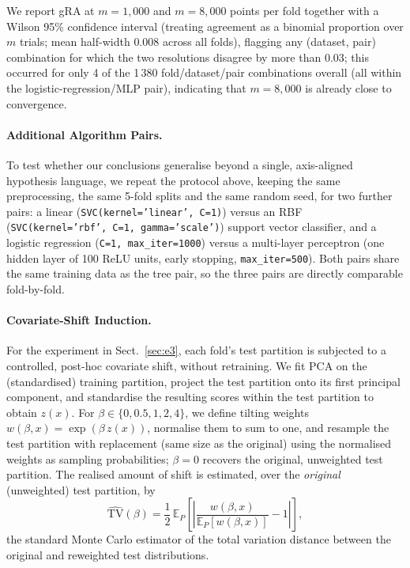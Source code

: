 \documentclass[runningheads]{llncs}
\begin{document}
We report gRA at $m = 1{,}000$ and $m = 8{,}000$ points per fold together with a Wilson 95\% confidence interval (treating agreement as a binomial proportion over $m$ trials; mean half-width $0.008$ across all folds), flagging any (dataset, pair) combination for which the two resolutions disagree by more than $0.03$; this occurred for only 4 of the 1\,380 fold/dataset/pair combinations overall (all within the logistic-regression/MLP pair), indicating that $m = 8{,}000$ is already close to convergence.

\paragraph{Additional Algorithm Pairs.}
\label{sec:extra-pairs}
To test whether our conclusions generalise beyond a single, axis-aligned hypothesis language, we repeat the protocol above, keeping the same preprocessing, the same 5-fold splits and the same random seed, for two further pairs: a linear (\texttt{SVC(kernel='linear', C=1)}) versus an RBF (\texttt{SVC(kernel='rbf', C=1, gamma='scale')}) support vector classifier, and a logistic regression (\texttt{C=1, max\_iter=1000}) versus a multi-layer perceptron (one hidden layer of 100 ReLU units, early stopping, \texttt{max\_iter=500}). Both pairs share the same training data as the tree pair, so the three pairs are directly comparable fold-by-fold.

\paragraph{Covariate-Shift Induction.}
\label{sec:shift-protocol}
For the experiment in Sect.~\ref{sec:e3}, each fold's test partition is subjected to a controlled, post-hoc covariate shift, without retraining. We fit PCA on the (standardised) training partition, project the test partition onto its first principal component, and standardise the resulting scores within the test partition to obtain $z(x)$. For $\beta \in \{0, 0.5, 1, 2, 4\}$, we define tilting weights $w(\beta, x) = \exp(\beta\, z(x))$, normalise them to sum to one, and resample the test partition with replacement (same size as the original) using the normalised weights as sampling probabilities; $\beta = 0$ recovers the original, unweighted test partition. The realised amount of shift is estimated, over the \emph{original} (unweighted) test partition, by
\begin{equation}
  \label{eq:tvhat}
  \widehat{\mathrm{TV}}(\beta) = \frac{1}{2}\, \mathbb{E}_{P}\left[\left\lvert \frac{w(\beta, x)}{\mathbb{E}_P[w(\beta,x)]} - 1 \right\rvert\right],
\end{equation}
the standard Monte Carlo estimator of the total variation distance between the original and reweighted test distributions.
\end{document}
